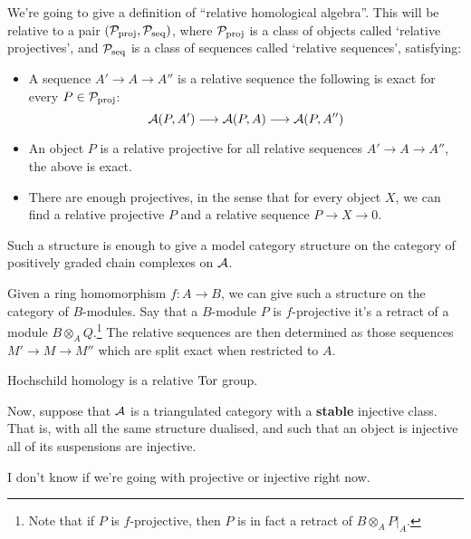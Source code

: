 \documentclass[11pt]{article}
\begin{document}
We're going to give a definition of ``relative homological algebra''. This will be relative to a pair $(\mathcal{P}_{\textup{proj}},\mathcal{P}_{\textup{seq}})$, where $\mathcal{P}_{\textup{proj}}$ is a class of objects called `relative projectives', and $\mathcal{P}_{\textup{seq}}$ is a class of sequences called `relative sequences', satisfying:
\begin{itemize}\squishlist
\item A sequence $A'\to A\to A''$ is a relative sequence \Iff the following is exact for every $P\in\mathcal{P}_{\textup{proj}}$:
\[\mathcal{A}(P,A')\longrightarrow\mathcal{A}(P,A)\longrightarrow\mathcal{A}(P,A'')\]
\item An object $P$ is a relative projective \Iff for all relative sequences $A'\to A\to A''$, the above is exact.
\item There are enough projectives, in the sense that for every object $X$, we can find a relative projective $P$ and a relative sequence $P\to X\to0$.
\end{itemize}
Such a structure is enough to give a model category structure on the category of positively graded chain complexes on $\mathcal{A}$.

\begin{exmp*}
Given a ring homomorphism $f:A\to B$, we can give such a structure on the category of $B$-modules. Say that a $B$-module $P$ is $f$-projective \Iff it's a retract of a module $B\otimes_AQ$.\footnote{Note that if $P$ is $f$-projective, then $P$ is in fact a retract of $B\otimes_AP|_A$.} The relative sequences are then determined as those sequences $M'\to M\to M''$ which are split exact when restricted to $A$.
\end{exmp*}
\begin{exmp*}
Hochschild homology is a relative $\operatorname{Tor}$ group.
\end{exmp*}

Now, suppose that $\mathcal{A}$ is a triangulated category with a \textbf{stable} injective class. That is, with all the same structure dualised, and such that an object is injective \Iff all of its suspensions are injective.

\begin{shaded}
I don't know if we're going with projective or injective right now.
\end{shaded}
\end{document}
